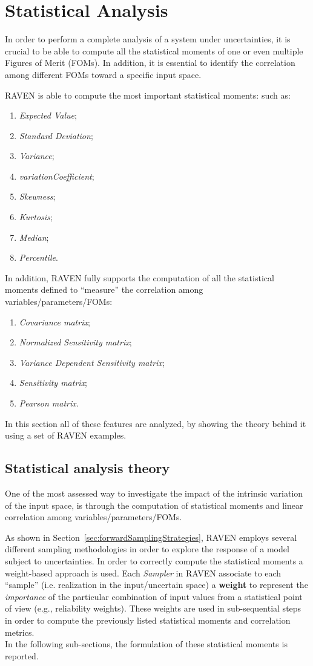 \section{Statistical Analysis}
\label{sec:statisticalAnalysis}
In order to perform a complete analysis of a system under uncertainties,
it is crucial to be able to compute all the statistical moments of one or even multiple
Figures of Merit (FOMs). In addition, it is essential to identify the correlation
among different FOMs toward a specific input space. 

RAVEN is able to compute the most important statistical moments:
such as:
\begin{enumerate}
  \item \textit{Expected Value};
  \item \textit{Standard Deviation};
  \item \textit{Variance};
  \item \textit{variationCoefficient}; 
  \item \textit{Skewness};
  \item \textit{Kurtosis};  
  \item \textit{Median}; 
  \item \textit{Percentile}.
\end{enumerate} 
In addition, RAVEN fully supports the computation of all the statistical moments defined to
``measure'' the correlation among variables/parameters/FOMs:
\begin{enumerate}
  \item \textit{Covariance matrix};
  \item \textit{Normalized Sensitivity  matrix};
  \item \textit{Variance Dependent Sensitivity  matrix};
  \item \textit{Sensitivity matrix}; 
  \item \textit{Pearson matrix}.
\end{enumerate} 
In this section all of these features are analyzed, by showing the theory behind it
using a set of RAVEN examples.
\subsection{Statistical analysis theory}
One of the most assessed way to investigate the impact of the intrinsic variation of the input space, is through the computation of 
statistical moments and linear correlation among variables/parameters/FOMs. 

As shown in Section~\ref{sec:forwardSamplingStrategies}, RAVEN employs several different sampling methodologies in order to explore the response of a model subject to uncertainties. In order to correctly compute the statistical moments a weight-based approach is used. Each \textit{Sampler} in RAVEN associate to each ``sample'' (i.e.
realization in the input/uncertain space) a \textbf{weight}  to represent the \textit{importance} of the particular
combination of input values from a statistical point of view (e.g., reliability weights). These weights are used in sub-sequential
steps in order to compute the previously listed statistical moments and correlation metrics.
\\In the following sub-sections, the formulation of these statistical moments is reported.
